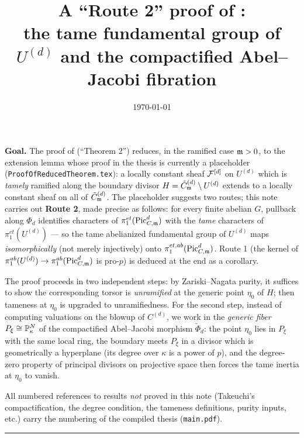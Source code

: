 \documentclass[11pt]{article}
\title{A ``Route 2'' proof of
\texorpdfstring{\Cref{lemma:ExtensionOfTamelyRamifiedSheaf}}{the extension lemma}:\\
the tame fundamental group of \texorpdfstring{$U^{(d)}$}{U(d)} and the
compactified Abel--Jacobi fibration}
\author{}
\date{\today}
\begin{document}
\maketitle

\noindent\textbf{Goal.}
The proof of  (``Theorem 2'') reduces, in the ramified
case $\mdls > 0$, to the extension lemma whose proof in the thesis is
currently a placeholder (\texttt{ProofOfReducedTheorem.tex}): a locally
constant sheaf $\cF^{[d]}$ on $U^{(d)}$ which is \emph{tamely} ramified along
the boundary divisor $H = \Cmod{d} \setminus U^{(d)}$ extends to a locally
constant sheaf on all of $\Cmod{d}$. The placeholder suggests two routes;
this note carries out \textbf{Route 2}, made precise as follows: for every
finite abelian $G$, pullback along $\Phi_d$ identifies characters of
$\pi_1^{et}(\PicCm[d])$ with the \emph{tame} characters of
$\pi_1^{et}(U^{(d)})$ --- so the tame abelianized fundamental group of
$U^{(d)}$ maps \emph{isomorphically} (not merely injectively) onto
$\pi_1^{et,ab}(\PicCm[d])$. Route 1 (the kernel of
$\pi_1^{ab}(U^{(d)}) \to \pi_1^{ab}(\PicCm[d])$ is pro-$p$) is deduced at the
end as a corollary.

The proof proceeds in two independent steps: by Zariski--Nagata purity, it
suffices to show the corresponding torsor is \emph{unramified} at the generic
point $\eta_0$ of $H$; then tameness at $\eta_0$ is upgraded to
unramifiedness. For the second step, instead of computing valuations on the
blowup of $C^{(d)}$, we work in the \emph{generic fiber}
$P_\xi \cong \bP^N_\kappa$ of the compactified Abel--Jacobi morphism
$\tilde{\Phi}_d$: the point $\eta_0$ lies in $P_\xi$ with the same local
ring, the boundary meets $P_\xi$ in a divisor which is geometrically a
hyperplane (its degree over $\kappa$ is a power of $p$), and the degree-zero
property of principal divisors on projective space then forces the tame
inertia at $\eta_0$ to vanish.

All numbered references to results \emph{not} proved in this note
(Takeuchi's compactification, the degree condition, the tameness
definitions, purity inputs, etc.) carry the numbering of the compiled thesis
(\texttt{main.pdf}).

\bigskip
\hrule
\bigskip



\printbibliography
\end{document}
